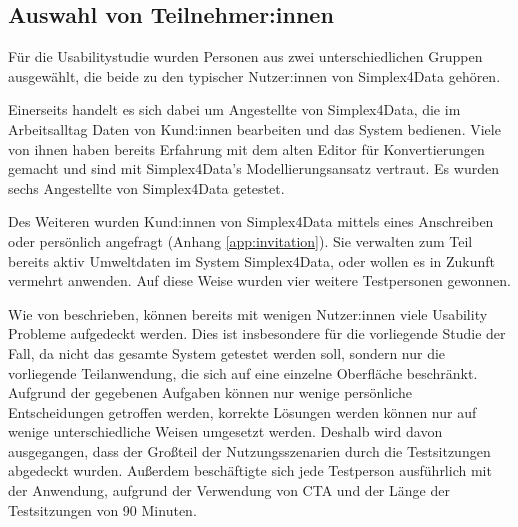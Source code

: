 \subsection{Auswahl von Teilnehmer:innen}

Für die Usabilitystudie wurden Personen aus zwei unterschiedlichen Gruppen ausgewählt, die beide zu den typischer Nutzer:innen von Simplex4Data gehören.

Einerseits handelt es sich dabei um Angestellte von Simplex4Data, die im Arbeitsalltag Daten von Kund:innen bearbeiten und das System bedienen. Viele von ihnen haben bereits Erfahrung mit dem alten Editor für Konvertierungen gemacht und sind mit Simplex4Data's Modellierungsansatz vertraut. Es wurden sechs Angestellte von Simplex4Data getestet.

Des Weiteren wurden Kund:innen von Simplex4Data mittels eines Anschreiben oder persönlich angefragt (Anhang \ref{app:invitation}). Sie verwalten zum Teil bereits aktiv Umweltdaten im System Simplex4Data, oder wollen es in Zukunft vermehrt anwenden. Auf diese Weise wurden vier weitere Testpersonen gewonnen.

Wie von \textcite{nielsenWhyYou2000} beschrieben, können bereits mit wenigen Nutzer:innen viele Usability Probleme aufgedeckt werden. Dies ist insbesondere für die vorliegende Studie der Fall, da nicht das gesamte System getestet werden soll, sondern nur die vorliegende Teilanwendung, die sich auf eine einzelne Oberfläche beschränkt. Aufgrund der gegebenen Aufgaben können nur wenige persönliche Entscheidungen getroffen werden, korrekte Lösungen werden können nur auf wenige unterschiedliche Weisen umgesetzt werden. Deshalb wird davon ausgegangen, dass der Großteil der Nutzungsszenarien durch die Testsitzungen abgedeckt wurden. Außerdem beschäftigte sich jede Testperson ausführlich mit der Anwendung, aufgrund der Verwendung von \ac{CTA} und der Länge der Testsitzungen von 90 Minuten.
